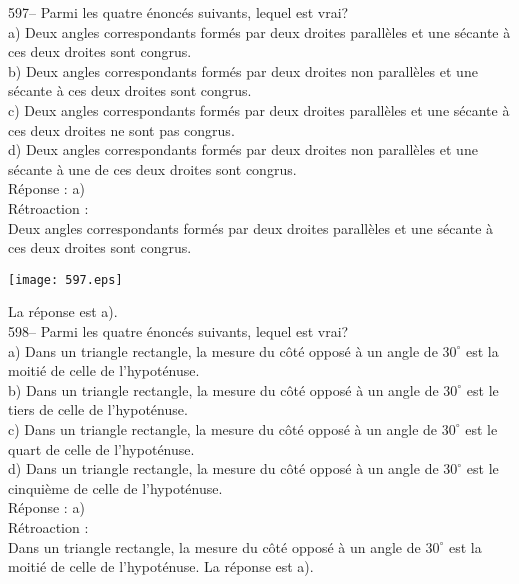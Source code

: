﻿\documentclass[letterpaper, 12pt]{article}
\begin{document}
597-- Parmi les quatre \'enonc\'es suivants, lequel est vrai?\\
a) Deux angles correspondants form\'es par deux droites parall\`eles et une
s\'ecante \`a ces deux droites sont congrus.\\
b) Deux angles correspondants form\'es par deux droites non parall\`eles et
une s\'ecante \`a ces deux droites sont congrus.\\
c) Deux angles correspondants form\'es par deux droites parall\`eles et une
s\'ecante \`a ces deux droites ne sont pas congrus.\\
d) Deux angles correspondants form\'es par deux droites non parall\`eles et
une s\'ecante \`a une de ces deux droites sont congrus.\\

R\'eponse : a)\\

R\'etroaction : \\
Deux angles correspondants form\'es par deux droites parall\`eles et
une s\'ecante \`a ces deux droites sont congrus.   \begin{center}
    \texttt{[image: 597.eps]}
    \end{center}  La r\'eponse est a).\\

598-- Parmi les quatre \'enonc\'es suivants, lequel est vrai?\\
a) Dans un triangle rectangle, la mesure du c\^ot\'e oppos\'e \`a un angle
de $30^{\circ}$ est la moiti\'e de celle de l'hypot\'enuse.\\
b) Dans un triangle rectangle, la mesure du c\^ot\'e oppos\'e \`a un angle
de $30^{\circ}$ est le tiers de celle de l'hypot\'enuse. \\
c) Dans un triangle rectangle, la mesure du c\^ot\'e oppos\'e \`a un angle
de $30^{\circ}$ est le quart de celle de l'hypot\'enuse.  \\
d) Dans un triangle rectangle, la mesure du c\^ot\'e oppos\'e \`a un angle
de $30^{\circ}$ est le cinqui\`eme de celle de l'hypot\'enuse.  \\

R\'eponse : a)\\

R\'etroaction : \\
Dans un triangle rectangle, la mesure du c\^ot\'e oppos\'e \`a un angle de
$30^{\circ}$ est la moiti\'e de celle de l'hypot\'enuse.  La r\'eponse est
a).\\
\end{document}
